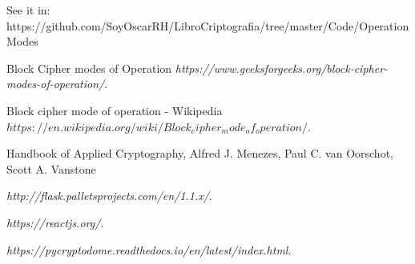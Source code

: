 \documentclass[fleqn, journal, onecolumn]{IEEEtran}             %
\theoremstyle{break}                                            %
\begin{document}
    See it in: https://github.com/SoyOscarRH/LibroCriptografia/tree/master/Code/OperationModes
    
    
    




  \begin{thebibliography}{10}

        Block Cipher modes of Operation
          \textit{https://www.geeksforgeeks.org/block-cipher-modes-of-operation/}. 

        Block cipher mode of operation - Wikipedia
          \textit{$https://en.wikipedia.org/wiki/Block_cipher_mode_of_operation/$}. 
  
        Handbook of Applied Cryptography, 
        Alfred J. Menezes,
        Paul C. van Oorschot,
        Scott A. Vanstone 

        \textit{http://flask.palletsprojects.com/en/1.1.x/}. 

        \textit{https://reactjs.org/}. 

        \textit{https://pycryptodome.readthedocs.io/en/latest/index.html}. 



  \end{thebibliography}
\end{document}
